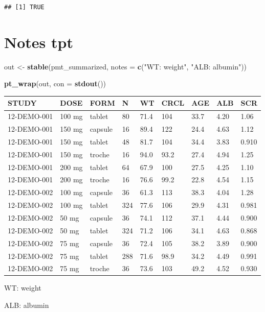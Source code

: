 \documentclass[
]{article}
\newenvironment{Shaded}{\begin{snugshade}}{\end{snugshade}}
\newcommand{\DataTypeTok}[1]{\textcolor[rgb]{0.13,0.29,0.53}{#1}}
\newcommand{\KeywordTok}[1]{\textcolor[rgb]{0.13,0.29,0.53}{\textbf{#1}}}
\newcommand{\NormalTok}[1]{#1}
\newcommand{\StringTok}[1]{\textcolor[rgb]{0.31,0.60,0.02}{#1}}
\begin{document}
\begin{verbatim}
## [1] TRUE
\end{verbatim}

\clearpage

\hypertarget{notes-tpt}{%
\section{Notes tpt}\label{notes-tpt}}

\begin{Shaded}
\begin{Highlighting}[]
\NormalTok{out <-}\StringTok{ }\KeywordTok{stable}\NormalTok{(pmt_summarized, }\DataTypeTok{notes =} \KeywordTok{c}\NormalTok{(}\StringTok{"WT: weight"}\NormalTok{, }\StringTok{"ALB: albumin"}\NormalTok{))}

\KeywordTok{pt_wrap}\NormalTok{(out, }\DataTypeTok{con =} \KeywordTok{stdout}\NormalTok{()) }
\end{Highlighting}
\end{Shaded}

\begin{table}[h]
\centering
{\def\arraystretch{1.4}\tabcolsep=5pt
\begin{threeparttable}
\begin{tabular}[h]{lllllllll}
\hline
STUDY & DOSE & FORM & N & WT & CRCL & AGE & ALB & SCR \\
\hline
12-DEMO-001 & 100 mg & tablet & 80 & 71.4 & 104 & 33.7 & 4.20 & 1.06 \\
12-DEMO-001 & 150 mg & capsule & 16 & 89.4 & 122 & 24.4 & 4.63 & 1.12 \\
12-DEMO-001 & 150 mg & tablet & 48 & 81.7 & 104 & 34.4 & 3.83 & 0.910 \\
12-DEMO-001 & 150 mg & troche & 16 & 94.0 & 93.2 & 27.4 & 4.94 & 1.25 \\
12-DEMO-001 & 200 mg & tablet & 64 & 67.9 & 100 & 27.5 & 4.25 & 1.10 \\
12-DEMO-001 & 200 mg & troche & 16 & 76.6 & 99.2 & 22.8 & 4.54 & 1.15 \\
12-DEMO-002 & 100 mg & capsule & 36 & 61.3 & 113 & 38.3 & 4.04 & 1.28 \\
12-DEMO-002 & 100 mg & tablet & 324 & 77.6 & 106 & 29.9 & 4.31 & 0.981 \\
12-DEMO-002 & 50 mg & capsule & 36 & 74.1 & 112 & 37.1 & 4.44 & 0.900 \\
12-DEMO-002 & 50 mg & tablet & 324 & 71.2 & 106 & 34.1 & 4.63 & 0.868 \\
12-DEMO-002 & 75 mg & capsule & 36 & 72.4 & 105 & 38.2 & 3.89 & 0.900 \\
12-DEMO-002 & 75 mg & tablet & 288 & 71.6 & 98.9 & 34.2 & 4.49 & 0.991 \\
12-DEMO-002 & 75 mg & troche & 36 & 73.6 & 103 & 49.2 & 4.52 & 0.930 \\
\hline
\end{tabular}
\begin{tablenotes}[flushleft]
\item WT: weight
\item ALB: albumin
\end{tablenotes}
\end{threeparttable}
}
\end{table}
\end{document}
